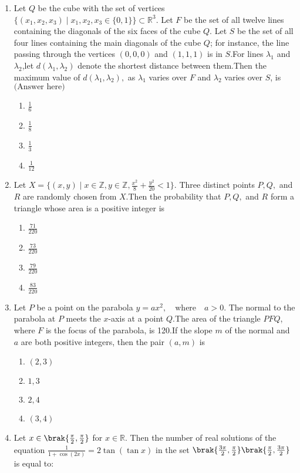 \documentclass[12pt,a4paper]{article}
\begin{document}
\begin{enumerate}
\item Let $Q$ be the cube with the set of vertices $ \{(x_1, x_2, x_3) \mid x_1, x_2, x_3 \in \{0,1\} \} \subset \mathbb{R}^3.$ Let $F$ be the set of all twelve lines containing the diagonals of the six faces of the cube $Q$. Let $S$ be the set of all four lines containing the main diagonals of the cube $Q$; for instance, the line passing through the vertices $(0,0,0)$ and $(1,1,1)$ is in $S$.For lines $\lambda_1$ and $\lambda_2$,let $ d(\lambda_1, \lambda_2) $ denote the shortest distance between them.Then the maximum value of $ d(\lambda_1, \lambda_2), $ as $\lambda_1$ varies over $F$ and $\lambda_2$ varies over $S$, is $ \text{(Answer here)} $
\begin{enumerate}
\item $\frac{1}{6}$
\item $\frac{1}{8}$
\item $\frac{1}{3}$
\item $\frac{1}{12}$
\end{enumerate}

\item Let $ X = \{(x,y) \mid x \in \mathbb{Z}, y \in \mathbb{Z}, \frac{x^2}{8} + \frac{y^2}{20} < 1\}.$ Three distinct points $P, Q,$ and $R$ are randomly chosen from $X$.Then the probability that $P, Q,$ and $R$ form a triangle whose area is a positive integer is 
\begin{enumerate}
\item $\frac{71}{220}$
\item $\frac{73}{220}$
\item $\frac{79}{220}$
\item $\frac{83}{220}$
\end{enumerate}

\item Let $P$ be a point on the parabola $ y = ax^2, \quad \text{where} \quad a > 0.$ The normal to the parabola at $P$ meets the $x$-axis at a point $Q$.The area of the triangle $PFQ$, where $F$ is the focus of the parabola, is 120.If the slope $m$ of the normal and $a$ are both positive integers, then the pair $(a, m)$ is 
\begin{enumerate}
\item $(2, 3)$
\item ${1, 3}$
\item ${2, 4}$
\item $(3, 4)$
\end{enumerate}


\item Let $x \in \brak{\frac{\pi}{2},\frac{\pi}{2}}$ for $x \in \mathbb{R}$. Then the number of real solutions of the equation  
$ \frac{1}{1 + \cos(2x)} = 2 \tan (\tan x) $  
in the set $ \brak{\frac{3\pi}{2},\frac{\pi}{2}} \brak{ \frac{\pi}{2}, \frac{3\pi}{2}} $ is equal to:




\end{enumerate}
\end{document}
